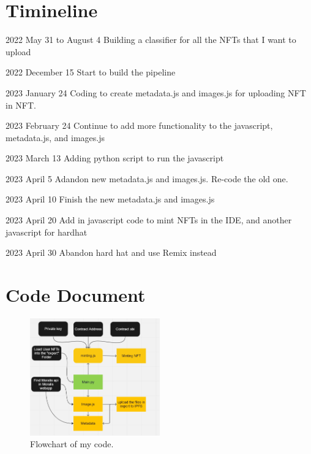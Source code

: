 \documentclass[10pt,twocolumn]{article}
\begin{document}
\section{Timineline}
2022 May 31 to August 4 Building a classifier for all the NFTs that I want to upload

2022 December 15 Start to build the pipeline

2023 January 24 Coding to create  metadata.js and images.js for uploading NFT in NFT.

2023 February 24 Continue to add more functionality to the javascript, metadata.js, and images.js

2023 March 13 Adding python script to run the javascript

2023 April 5 Adandon new  metadata.js and images.js. Re-code the old one.

2023 April 10 Finish the new  metadata.js and images.js

2023 April 20 Add in javascript code to mint NFTs in the IDE, and another javascript for hardhat

2023 April 30 Abandon hard hat and use Remix instead



\section{Code Document}
\begin{figure}[tb]
  \centering
  \includegraphics[width=0.5\textwidth]{flowchart.png}
  \caption{Flowchart of my code.}
  \label{fig:1}
\end{figure}






\printbibliography
\end{document}
